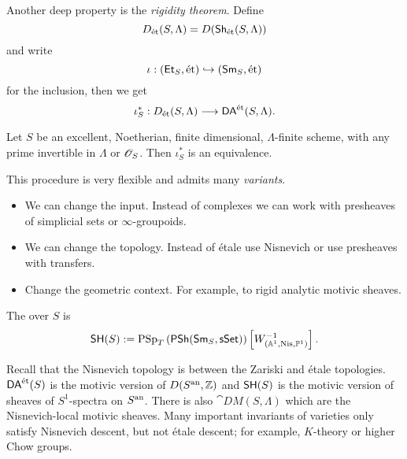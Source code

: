 Another deep property is the \emph{rigidity theorem}. Define
\[
D_{\text{\'et}}(S,\Lambda) = D(\mathsf{Sh}_{\text{\'et}}(S,\Lambda))
\]
and write
\[
\iota : (\mathsf{Et}_S, \text{\'et})\hookrightarrow (\mathsf{Sm}_S,\text{\'et})
\]
for the inclusion, then we get
\[
\iota_S^{*}:D_{\text{\'et}}(S,\Lambda) \to \DAet(S,\Lambda).
\]
\begin{theorem}[Ayoub]
Let $S$ be an excellent, Noetherian, finite dimensional, $\Lambda$-finite scheme, with any prime
invertible in $\Lambda$ or $\mathscr{O}_S$. Then $\iota_S^{*}$ is an equivalence.
\end{theorem}

This procedure is very flexible and admits many \emph{variants}.
\begin{itemize}
\item We can change the input. Instead of complexes we can work with presheaves of
simplicial sets or $\infty$-groupoids.
\item We can change the topology. Instead of \'etale use Nisnevich or use presheaves with transfers.
\item Change the geometric context. For example, to rigid analytic motivic sheaves.
\end{itemize}

\begin{definition}
The  over $S$ is
\[
\mathsf{SH}(S) :=
\operatorname{PSp}_T\left(\mathsf{PSh}(\mathsf{Sm}_S,\mathsf{sSet})\right)\left[W^{-1}_{(\mathbb A^{1},\text{Nis},\mathbb{P}^{1})}\right].
\]
\end{definition}
Recall that the Nisnevich topology is between the Zariski and \'etale topologies.
$\mathsf{DA}^\text{\'et}(S)$ is the motivic version of $D(S^\text{an},\mathbb Z)$ and $\mathsf{SH}(S)$ is the motivic version of
sheaves of $S^1$-spectra on $S^\text{an}$. %
There is also $\cat{DM}(S,\Lambda)$ which are the
Nisnevich-local motivic sheaves. Many important invariants of varieties only satisfy
Nisnevich descent, but not \'etale descent; for example, $K$-theory or higher Chow groups.

